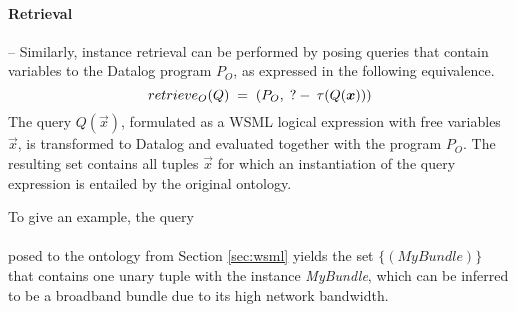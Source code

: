 \paragraph{Retrieval} -- Similarly, instance retrieval can be
performed by posing queries that contain variables to the Datalog
program $P_O$, as expressed in the following equivalence.
\begin{displaymath}
   retrieve_O(Q) \; = \; (P_O, \qury \tau(Q(\vec{x})))
\end{displaymath}
The query $Q(\vec{x})$, formulated as a WSML logical expression
with free variables $\vec{x}$, is transformed to Datalog and
evaluated together with the program $P_O$. The resulting set
contains all tuples $\vec{x}$ for which an instantiation of the
query expression is entailed by the original ontology.

To give an example, the query\\
\phantom{mmmmm}   \\
posed to the ontology from Section \ref{sec:wsml} yields the set
$\{ (\textit{MyBundle}) \}$ that contains one unary tuple with the
instance \textit{MyBundle}, which can be inferred to be a
broadband bundle due to its high network bandwidth.

%
